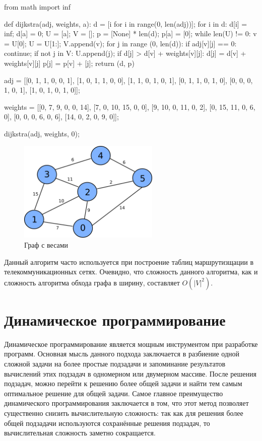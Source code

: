 \begin{python}
from math import inf

def dijkstra(adj, weights, a):
	d = [i for i in range(0, len(adj))];
	for i in d:
		d[i] = inf;
	d[a] = 0;
	U = [a];
	V = [];
	p = [None] * len(d);
	p[a] = [0];
	while len(U) != 0:
		v = U[0];
		U = U[1:];
		V.append(v);
		for j in range (0, len(d)):
			if adj[v][j] == 0:
				continue;
			if not j in V:
				U.append(j);
			if d[j] > d[v] + weights[v][j]:
				d[j] = d[v] + weights[v][j]
				p[j] = p[v] + [j];
	return (d, p)

adj = [[0, 1, 1, 0, 0, 1],
		[1, 0, 1, 1, 0, 0],
		[1, 1, 0, 1, 0, 1],
		[0, 1, 1, 0, 1, 0],
		[0, 0, 0, 1, 0, 1],
		[1, 0, 1, 0, 1, 0]];

weights = [[0, 7, 9, 0, 0, 14],
		[7, 0, 10, 15, 0, 0],
		[9, 10, 0, 11, 0, 2],
		[0, 15, 11, 0, 6, 0],
		[0, 0, 0, 6, 0, 6],
		[14, 0, 2, 0, 9, 0]];

dijkstra(adj, weights, 0);
\end{python}

\begin{figure}
\centering
\includegraphics[width=0.6\textwidth]{graphics/dijkstra.png}
\caption{Граф с весами}
\label{fig:dijkstra}
\end{figure}

Данный алгоритм часто используется при построение таблиц маршрутизщации в 
телекоммуникационных сетях. Очевидно, что сложность данного алгоритма,
как и сложность алгоритма обхода графа в ширину, составляет $O(|V|^2)$.

\section{Динамическое программирование}

Динамическое программирование является мощным инструментом 
при разработке программ. Основная мысль данного подхода заключается 
в разбиение одной сложной задачи на более простые подзадачи и запоминание 
результатов вычислений этих подзадач в одномерном или двумерном массиве. 
После решения подзадач, можно перейти к решению более общей задачи и найти тем 
самым оптимальное решение для общей задачи. Самое главное преимущество динамического
программирования заключается в том, что этот метод позволяет существенно снизить 
вычислительную сложность: так как для решения более общей подзадачи используются
сохранённые решения подзадач, то вычислительная сложность заметно сокращается. 

